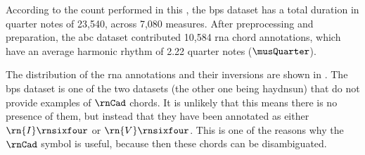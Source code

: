 
According to the count performed in this \thesisdiss{}, the
\gls{bps} dataset has a total duration in quarter notes of
23,540, across 7,080 measures. After preprocessing and
preparation, the \gls{abc} dataset contributed 10,584
\gls{rna} chord annotations, which have an average harmonic
rhythm of 2.22 quarter notes ($\musQuarter$).

The distribution of the \gls{rna} annotations and their
inversions are shown in . The
\gls{bps} dataset is one of the two datasets (the other one
being \gls{haydnsun}) that do not provide examples of
$\rnCad$ chords. It is unlikely that this means there is no
presence of them, but instead that they have been annotated
as either $\rn{I}\rnsixfour$ or $\rn{V}\rnsixfour$. This is
one of the reasons why the $\rnCad$ symbol is useful,
because then these chords can be disambiguated.



